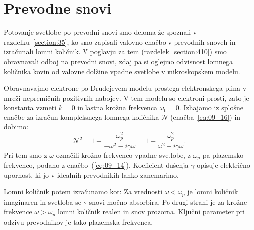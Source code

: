\section{Prevodne snovi}
Potovanje svetlobe po prevodni snovi smo deloma že spoznali v 
razdelku~\ref{section:35}, ko smo zapisali valovno enačbo 
v prevodnih snoveh in izračunali lomni količnik.
V  poglavju za tem (razdelek~\ref{section:410}) 
smo obravnavali odboj na prevodni snovi, zdaj pa si oglejmo odvisnost
lomnega količnika kovin od valovne dolžine vpadne svetlobe v mikroskopskem
modelu.

Obravnavajmo elektrone po Drudejevem modelu prostega elektronskega plina
v mreži nepremičnih pozitivnih nabojev. V tem modelu so elektroni prosti,
zato je konstanta vzmeti $k=0$ in lastna krožna frekvenca $\omega_0=0$. Izhajamo 
iz splošne enačbe za izračun kompleksnega lomnega količnika $\mathcal{N}$
(enačba~\ref{eq:09_16}) in dobimo:
\begin{equation}
\mathcal{N}^2 = 1 + \frac{\omega_p^2}{-\omega^2 -i \gamma \omega} = 1- 
\frac{\omega_p^2}{\omega^2+i\gamma \omega}.
\label{eq:09_36}
\end{equation}
Pri tem smo z $\omega$ označili krožno frekvenco vpadne svetlobe, z
$\omega_p$ pa plazemsko frekvenco, podano z enačbo~(\ref{eq:09_14}). 
Koeficient dušenja $\gamma$ opisuje električno upornost, ki jo v idealnih 
prevodnikih lahko zanemarimo. 

Lomni količnik potem izračunamo kot:
Za vrednosti $\omega < \omega_p$ je lomni količnik imaginaren in svetloba se v snovi
močno absorbira. Po drugi strani je za krožne frekvence $\omega > \omega_p$ lomni količnik realen 
in snov prozorna. Ključni parameter pri odzivu prevodnikov je tako plazemska frekvenca. 

